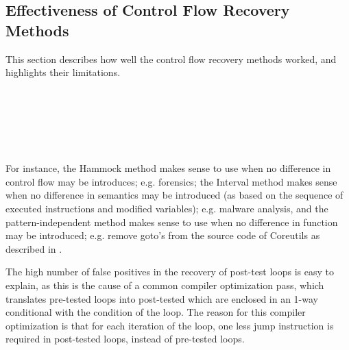 
\subsection{Effectiveness of Control Flow Recovery Methods}

This section describes how well the control flow recovery methods worked, and highlights their limitations.

 \\

 \\
 \\
 \\

For instance, the Hammock method makes sense to use when no difference in control flow may be introduces; e.g. forensics; the Interval method makes sense when no difference in semantics may be introduced (as based on the sequence of executed instructions and modified variables); e.g. malware analysis, and the pattern-independent method makes sense to use when no difference in function may be introduced; e.g. remove goto's from the source code of Coreutils as described in \cite{no_more_gotos}.


The high number of false positives in the recovery of post-test loops is easy to explain, as this is the cause of a common compiler optimization pass, which translates pre-tested loops into post-tested which are enclosed in an 1-way conditional with the condition of the loop. The reason for this compiler optimization is that for each iteration of the loop, one less jump instruction is required in post-tested loops, instead of pre-tested loops.
